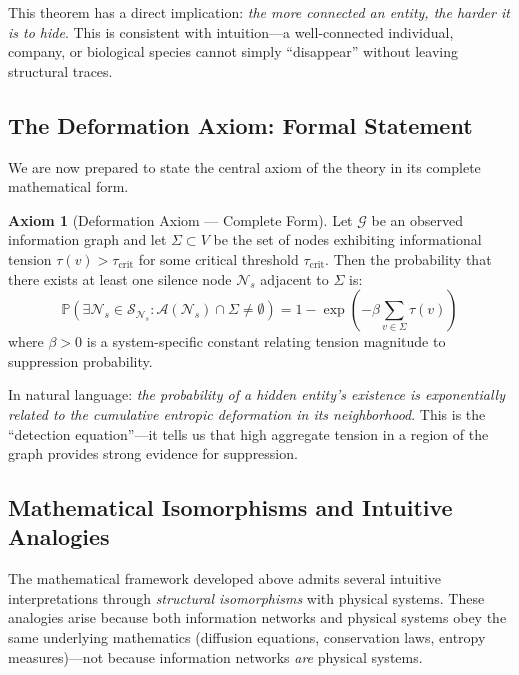 \documentclass[12pt,a4paper]{article}
\theoremstyle{definition}
\newtheorem{axiom}{Axiom}
\theoremstyle{remark}
\newcommand{\NS}{\mathcal{N}_s}          %
\newcommand{\CA}{\mathcal{A}}            %
\newcommand{\Prob}{\mathbb{P}}           %
\newcommand{\Graph}{\mathcal{G}}         %
\begin{document}
This theorem has a direct implication: \emph{the more connected an entity, the harder it is to hide}. This is consistent with intuition---a well-connected individual, company, or biological species cannot simply ``disappear'' without leaving structural traces.

\subsection{The Deformation Axiom: Formal Statement}

We are now prepared to state the central axiom of the theory in its complete mathematical form.

\begin{axiom}[Deformation Axiom — Complete Form]
\label{ax:deformation-complete}
Let $\Graph$ be an observed information graph and let $\Sigma \subset V$ be the set of nodes exhibiting informational tension $\tau(v) > \tau_{\text{crit}}$ for some critical threshold $\tau_{\text{crit}}$. Then the probability that there exists at least one silence node $\NS$ adjacent to $\Sigma$ is:
\begin{equation}
    \boxed{
    \Prob\left( \exists \NS \in \mathcal{S}_{\NS} : \CA(\NS) \cap \Sigma \neq \emptyset \right) 
    = 1 - \exp\left( -\beta \sum_{v \in \Sigma} \tau(v) \right)
    }
    \label{eq:deformation-axiom}
\end{equation}
where $\beta > 0$ is a system-specific constant relating tension magnitude to suppression probability.
\end{axiom}

In natural language: \emph{the probability of a hidden entity's existence is exponentially related to the cumulative entropic deformation in its neighborhood}. This is the ``detection equation''—it tells us that high aggregate tension in a region of the graph provides strong evidence for suppression.

\subsection{Mathematical Isomorphisms and Intuitive Analogies}

The mathematical framework developed above admits several intuitive interpretations through \emph{structural isomorphisms} with physical systems. These analogies arise because both information networks and physical systems obey the same underlying mathematics (diffusion equations, conservation laws, entropy measures)---not because information networks \emph{are} physical systems.
\end{document}
